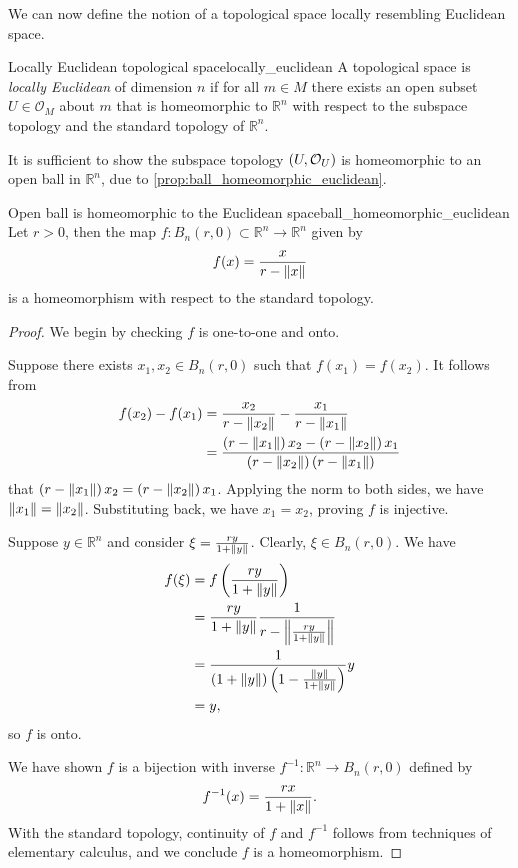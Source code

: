 We can now define the notion of a topological space locally resembling Euclidean space.
\begin{definition}{Locally Euclidean topological space}{locally_euclidean}
    A topological space  is \emph{locally Euclidean} of dimension \(n\) if for all \(m \in M\) there exists an open subset \(U \in \mathcal{O}_M\) about \(m\) that is homeomorphic to \(\mathbb{R}^n\) with respect to the subspace topology and the standard topology of \(\mathbb{R}^n\).
\end{definition}
It is sufficient to show the subspace topology \(\topology{U}\) is homeomorphic to an open ball in \(\mathbb{R}^n\), due to \cref{prop:ball_homeomorphic_euclidean}.
\begin{proposition}{Open ball is homeomorphic to the Euclidean space}{ball_homeomorphic_euclidean}
    Let \(r > 0\), then the map \(f : B_n(r, 0)\subset\mathbb{R}^n\to\mathbb{R}^n\) given by
    \[f(x) = \frac{x}{r - \norm{x}}\]
    is a homeomorphism with respect to the standard topology.
\end{proposition}
\begin{proof}
    We begin by checking \(f\) is one-to-one and onto.

    Suppose there exists \(x_1, x_2 \in B_n(r, 0)\) such that \(f(x_1) = f(x_2)\). It follows from
    \begin{align*}
        f(x_2) - f(x_1) &= \frac{x_2}{r - \norm{x_2}} - \frac{x_1}{r - \norm{x_1}}\\
                        &= \frac{\left(r - \norm{x_1}\right)x_2 - \left(r - \norm{x_2}\right)x_1}{\left(r - \norm{x_2}\right)\left(r - \norm{x_1}\right)}
    \end{align*}
    that \(\left(r - \norm{x_1}\right)x_2 = \left(r - \norm{x_2}\right)x_1\). Applying the norm to both sides, we have \(\norm{x_1} = \norm{x_2}\). Substituting back, we have \(x_1 = x_2\), proving \(f\) is injective.

    Suppose \(y \in \mathbb{R}^n\) and consider \(\xi = \frac{ry}{1 + \norm{y}}\). Clearly, \(\xi \in B_n(r,0)\). We have
    \begin{align*}
        f(\xi) &= f\left(\frac{ry}{1 + \norm{y}}\right)\\
               &= \frac{ry}{1 + \norm{y}} \frac{1}{r - \norm*{\frac{ry}{1 + \norm{y}}}}\\
               &= \frac{1}{\left(1 + \norm{y}\right)\left(1 - \frac{\norm{y}}{1 + \norm{y}}\right)} y\\
               &= y,
    \end{align*}
    so \(f\) is onto.

    We have shown \(f\) is a bijection with inverse \(f^{-1} : \mathbb{R}^n \to B_n(r, 0)\) defined by
    \begin{equation}
        f^{-1}(x) = \frac{rx}{1 + \norm{x}}.
    \end{equation}
    With the standard topology, continuity of \(f\) and \(f^{-1}\) follows from techniques of elementary calculus, and we conclude \(f\) is a homeomorphism.
\end{proof}
